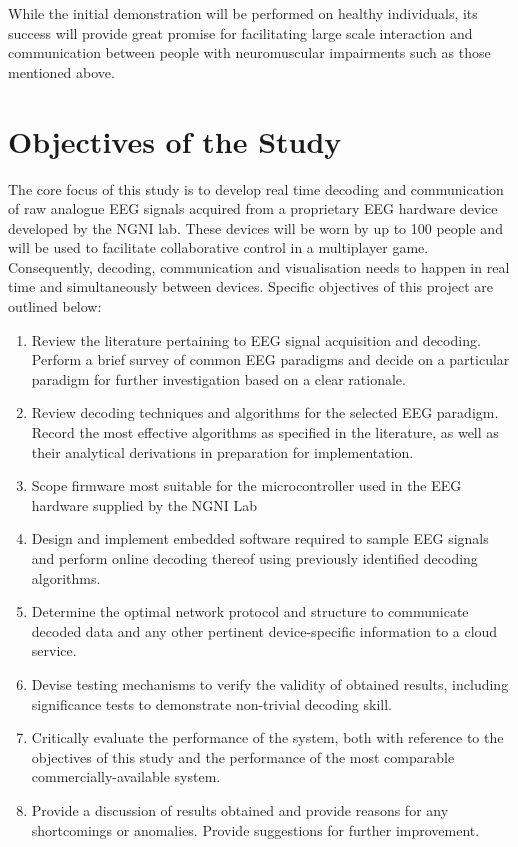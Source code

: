 While the initial demonstration will be performed on healthy individuals, its success will provide great promise for facilitating large scale interaction and communication between people with neuromuscular impairments such as those mentioned above.  

\section{Objectives of the Study}
The core focus of this study is to develop real time decoding and communication of raw analogue EEG signals acquired from a proprietary EEG hardware device developed by the NGNI lab. These devices will be worn by up to 100 people and will be used to facilitate collaborative control in a multiplayer game. Consequently, decoding, communication and visualisation needs to happen in real time and simultaneously between devices. Specific objectives of this project are outlined below:

\begin{enumerate}
    \item Review the literature pertaining to EEG signal acquisition and decoding. Perform a brief survey of common EEG paradigms and decide on a particular paradigm for further investigation based on a clear rationale. 
    \item Review decoding techniques and algorithms for the selected EEG paradigm. Record the most effective algorithms as specified in the literature, as well as their analytical derivations in preparation for implementation. 
    \item Scope firmware most suitable for the microcontroller used in the EEG hardware supplied by the NGNI Lab
    \item Design and implement embedded software required to sample EEG signals and perform online decoding thereof using previously identified decoding algorithms.
    \item Determine the optimal network protocol and structure to communicate decoded data and any other pertinent device-specific information to a cloud service.
    \item Devise testing mechanisms to verify the validity of obtained results, including significance tests to demonstrate non-trivial decoding skill.
    \item Critically evaluate the performance of the system, both with reference to the objectives of this study and the performance of the most comparable commercially-available system.
    \item Provide a discussion of results obtained and provide reasons for any shortcomings or anomalies. Provide suggestions for further improvement.
    
\end{enumerate}

